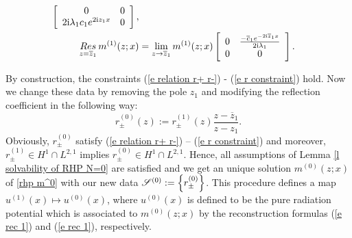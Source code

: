 \begin{samepage}
\begin{framed}
\begin{rhp}
\begin{enumerate}[(i)]
\begin{equation}
\begin{aligned}
                  \left[
                      \begin{array}{cc}
                        0 & 0 \\
                        2\mathrm{i}\lambda_1c_1 e^{2\mathrm{i} z_1x} & 0
                      \end{array}
                  \right],\\
                     \mathop{Res}_{z=\overline{z}_1} m^{(1)}(z;x)&=\lim_{z\to \overline{z}_1}m^{(1)}(z;x)
                  \left[
                      \begin{array}{cc}
                      0 & \frac{-\overline{c}_1 e^{-2\mathrm{i} \overline{z}_1x}}{2\mathrm{i}\lambda_1} \\
                      0 & 0
                      \end{array}
                  \right].
                  \end{aligned}
              \end{equation}
        \end{enumerate}
    \end{rhp}
\end{framed}
\end{samepage}
 By construction, the constraints (\ref{e relation r+ r-}) - (\ref{e r constraint}) hold. Now we change these data by removing the pole $z_1$ and modifying the reflection coefficient in the following way:
\begin{equation}\label{e r^0}
    r^{(0)}_{\pm}(z):=r^{(1)}_{\pm}(z) \frac{z-\overline{z}_1}{z-z_1}.
\end{equation}
Obviously, $r^{(0)}_{\pm}$ satisfy (\ref{e relation r+ r-}) -- (\ref{e r constraint}) and moreover, $r^{(1)}_{\pm}\in H^1\cap L^{2,1}$ implies $r^{(0)}_{\pm}\in H^1\cap L^{2,1}$. Hence, all assumptions of Lemma \ref{l solvability of RHP N=0} are satisfied and we get an unique solution $m^{(0)}(z;x)$ of \rh \ref{rhp m^0} with our new data $\mathcal{S}^{(0)}:=\left\{r^{(0)}_{\pm}\right\}$. This procedure defines a map $u^{(1)}(x)\mapsto u^{(0)}(x)$, where $u^{(0)}(x)$ is defined to be the pure radiation potential  which is associated to $m^{(0)}(z;x)$ by the reconstruction formulas (\ref{e rec 1}) and (\ref{e rec 1}), respectively.

 